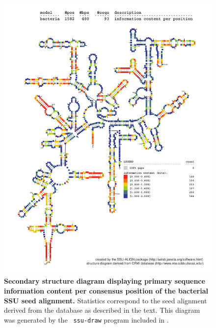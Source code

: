 \begin{figure}
\begin{center}
\includegraphics[width=5.7in]{Figures/bacteria-0p1-info}
\end{center}
\caption[Secondary structure diagram displaying primary sequence
  information content per consensus position of the bacterial SSU seed
  alignment]{\textbf{Secondary structure diagram displaying primary
  sequence information content per consensus position of the bacterial SSU seed
  alignment.} Statistics correspond to the  seed
  alignment derived from the  database \cite{CannoneGutell02}
  as described in the text. This diagram was generated by the {\tt
  ssu-draw} program included in .}
\label{fig:bacinfo}
\end{figure}



